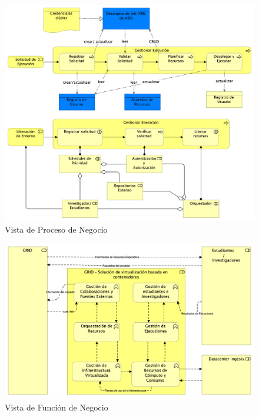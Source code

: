 \begin{figure}[H]
    \centering
    \includegraphics[width=\textwidth]{tablas-images/cp6/Business-Process-View.png}
    \caption{Vista de Proceso de Negocio}
\end{figure}
\begin{figure}[H]
    \centering
    \includegraphics[width=\textwidth]{tablas-images/cp6/Business-Function-View.png}
    \caption{Vista de Función de Negocio}
\end{figure}

